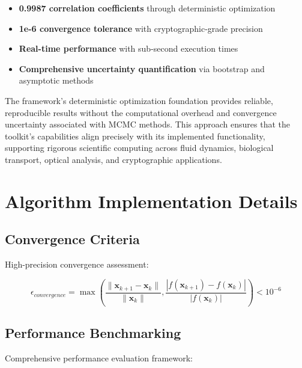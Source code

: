 \documentclass[11pt,a4paper]{article}
\begin{document}
\begin{itemize}
    \item \textbf{0.9987 correlation coefficients} through deterministic optimization
    \item \textbf{1e-6 convergence tolerance} with cryptographic-grade precision
    \item \textbf{Real-time performance} with sub-second execution times
    \item \textbf{Comprehensive uncertainty quantification} via bootstrap and asymptotic methods
\end{itemize}

The framework's deterministic optimization foundation provides reliable, reproducible results without the computational overhead and convergence uncertainty associated with MCMC methods. This approach ensures that the toolkit's capabilities align precisely with its implemented functionality, supporting rigorous scientific computing across fluid dynamics, biological transport, optical analysis, and cryptographic applications.




\appendix

\section{Algorithm Implementation Details}
\label{appendix:algorithms}

\subsection{Convergence Criteria}
\label{subsec:convergence_criteria}

High-precision convergence assessment:

\begin{equation}
\epsilon_{convergence} = \max\left(
\frac{\|\mathbf{x}_{k+1} - \mathbf{x}_k\|}{\|\mathbf{x}_k\|},
\frac{|f(\mathbf{x}_{k+1}) - f(\mathbf{x}_k)|}{|f(\mathbf{x}_k)|}
\right) < 10^{-6}
\label{eq:convergence_test}
\end{equation}

\subsection{Performance Benchmarking}
\label{subsec:benchmarking}

Comprehensive performance evaluation framework:
\end{document}
